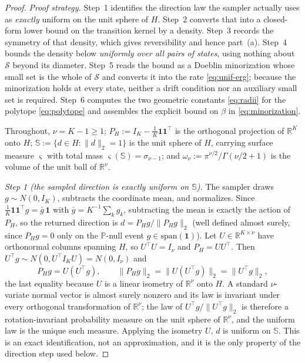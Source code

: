 \documentclass[11pt]{article}
\theoremstyle{plain}
\theoremstyle{definition}
\theoremstyle{remark}
\newcommand{\PP}{\mathbb{P}}
\newcommand{\R}{\mathbb{R}}
\newcommand{\cS}{\mathcal{S}}
\begin{document}
\begin{proof}
\emph{Proof strategy.} Step~1 identifies the direction law the sampler actually uses as
\emph{exactly} uniform on the unit sphere of $H$. Step~2 converts that into a closed-form
lower bound on the transition kernel by a density. Step~3 records the symmetry of that
density, which gives reversibility and hence part~(a). Step~4 bounds the density below
\emph{uniformly over all pairs of states}, using nothing about $\cS$ beyond its diameter.
Step~5 reads the bound as a Doeblin minorization whose small set is the whole of $\cS$ and
converts it into the rate \eqref{eq:unif-erg}; because the minorization holds at every
state, neither a drift condition nor an auxiliary small set is required. Step~6 computes
the two geometric constants \eqref{eq:radii} for the polytope \eqref{eq:polytope} and
assembles the explicit bound on $\beta$ in \eqref{eq:minorization}.

Throughout, $\nu=K-1\ge1$; $P_H:=I_K-\frac1K\mathbf1\mathbf1^\top$ is the orthogonal
projection of $\R^K$ onto $H$; $\mathbb S:=\{d\in H:\|d\|_2=1\}$ is the unit sphere of
$H$, carrying surface measure $\varsigma$ with total mass
$\varsigma(\mathbb S)=\sigma_{\nu-1}$; and $\omega_\nu:=\pi^{\nu/2}/\Gamma(\nu/2+1)$ is
the volume of the unit ball of $\R^\nu$.

\emph{Step 1 (the sampled direction is exactly uniform on $\mathbb S$).} The sampler
draws $g\sim N(0,I_K)$, subtracts the coordinate mean, and normalizes. Since
$\frac1K\mathbf1\mathbf1^\top g=\bar g\,\mathbf1$ with $\bar g=K^{-1}\sum_kg_k$,
subtracting the mean is exactly the action of $P_H$, so the returned direction is
$d=P_Hg/\|P_Hg\|_2$ (well defined almost surely, since $P_Hg=0$ only on the
$\PP$-null event $g\in\mathrm{span}(\mathbf1)$). Let $U\in\R^{K\times\nu}$ have
orthonormal columns spanning $H$, so $U^\top U=I_\nu$ and $P_H=UU^\top$. Then
$U^\top g\sim N(0,U^\top I_KU)=N(0,I_\nu)$ and
\[
    P_Hg = U(U^\top g), \qquad \|P_Hg\|_2 = \|U(U^\top g)\|_2 = \|U^\top g\|_2,
\]
the last equality because $U$ is a linear isometry of $\R^\nu$ onto $H$. A standard
$\nu$-variate normal vector is almost surely nonzero and its law is invariant under every
orthogonal transformation of $\R^\nu$; the law of $U^\top g/\|U^\top g\|_2$ is therefore a
rotation-invariant probability measure on the unit sphere of $\R^\nu$, and the uniform law
is the unique such measure. Applying the isometry $U$, $d$ is uniform on $\mathbb S$. This
is an exact identification, not an approximation, and it is the only property of the
direction step used below.


\end{proof}
\end{document}
